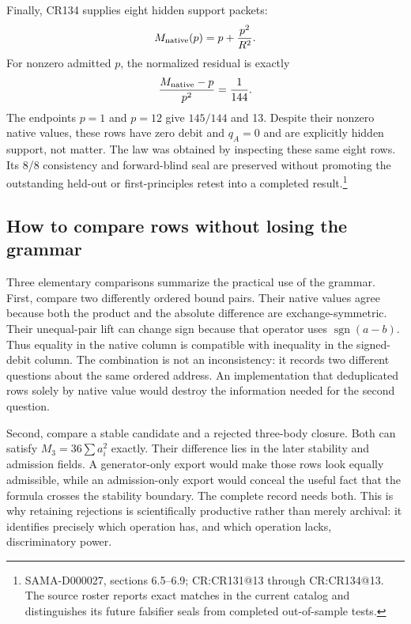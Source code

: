 Finally, CR134 supplies eight hidden support packets:
\begin{equation}
M_{\rm native}(p)=p+\frac{p^2}{R^2}.
\end{equation}
For nonzero admitted $p$, the normalized residual is exactly
\begin{equation}
\frac{M_{\rm native}-p}{p^2}=\frac1{144}.
\end{equation}
The endpoints $p=1$ and $p=12$ give $145/144$ and 13. Despite their nonzero native values, these rows have zero debit and $q_A=0$ and are explicitly hidden support, not matter. The law was obtained by inspecting these same eight rows. Its 8/8 consistency and forward-blind seal are preserved without promoting the outstanding held-out or first-principles retest into a completed result.\footnote{SAMA-D000027, sections 6.5--6.9; CR:CR131@13 through CR:CR134@13. The source roster reports exact matches in the current catalog and distinguishes its future falsifier seals from completed out-of-sample tests.}

\subsection{How to compare rows without losing the grammar}

Three elementary comparisons summarize the practical use of the grammar. First, compare two differently ordered bound pairs. Their native values agree because both the product and the absolute difference are exchange-symmetric. Their unequal-pair lift can change sign because that operator uses $\operatorname{sgn}(a-b)$. Thus equality in the native column is compatible with inequality in the signed-debit column. The combination is not an inconsistency: it records two different questions about the same ordered address. An implementation that deduplicated rows solely by native value would destroy the information needed for the second question.

Second, compare a stable candidate and a rejected three-body closure. Both can satisfy $M_3=36\sum a_i^2$ exactly. Their difference lies in the later stability and admission fields. A generator-only export would make those rows look equally admissible, while an admission-only export would conceal the useful fact that the formula crosses the stability boundary. The complete record needs both. This is why retaining rejections is scientifically productive rather than merely archival: it identifies precisely which operation has, and which operation lacks, discriminatory power.

